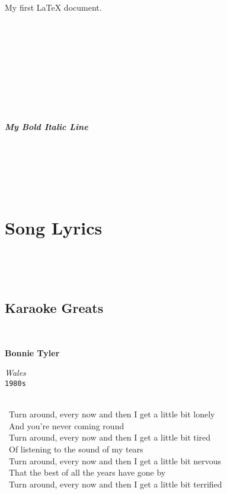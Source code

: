 \documentclass[12pt,a4paper]{article}
\begin{document}
 

 

 

My first \LaTeX{} document.

 

 

 

{

 

\large

 

\textbf{ \textit{ My Bold Italic Line} }

 

}

 

 

\section{Song Lyrics}

 

 

\subsection{Karaoke Greats}

 

\textbf{Bonnie Tyler}\newline

\textit{Wales}\\

\texttt{1980s}\\

 

 Turn around, every now
and then I get a little bit lonely \\

 And you're never
coming round \\

 Turn around, every now
and then I get a little bit tired \\

 Of listening to the
sound of my tears \\

 Turn around, every now
and then I get a little bit nervous \\

 That the best of all
the years have gone by \\

 Turn around, every now
and then I get a little bit terrified \\
\end{document}
